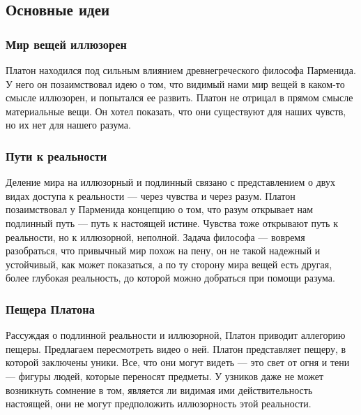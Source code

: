 \documentclass[
]{article}
\begin{document}
\hypertarget{ux43eux441ux43dux43eux432ux43dux44bux435-ux438ux434ux435ux438}{%
\subsection{Основные
идеи}\label{ux43eux441ux43dux43eux432ux43dux44bux435-ux438ux434ux435ux438}}

\hypertarget{ux43cux438ux440-ux432ux435ux449ux435ux439-ux438ux43bux43bux44eux437ux43eux440ux435ux43d}{%
\subsubsection{Мир вещей
иллюзорен}\label{ux43cux438ux440-ux432ux435ux449ux435ux439-ux438ux43bux43bux44eux437ux43eux440ux435ux43d}}

Платон находился под сильным влиянием древнегреческого философа
Парменида. У него он позаимствовал идею о том, что видимый нами мир
вещей в каком-то смысле иллюзорен, и попытался ее развить. Платон не
отрицал в прямом смысле материальные вещи. Он хотел показать, что они
существуют для наших чувств, но их нет для нашего разума.

\hypertarget{ux43fux443ux442ux438-ux43a-ux440ux435ux430ux43bux44cux43dux43eux441ux442ux438}{%
\subsubsection{Пути к
реальности}\label{ux43fux443ux442ux438-ux43a-ux440ux435ux430ux43bux44cux43dux43eux441ux442ux438}}

Деление мира на иллюзорный и подлинный связано с представлением о двух
видах доступа к реальности --- через чувства и через разум. Платон
позаимствовал у Парменида концепцию о том, что разум открывает нам
подлинный путь --- путь к настоящей истине. Чувства тоже открывают путь
к реальности, но к иллюзорной, неполной. Задача философа --- вовремя
разобраться, что привычный мир похож на пену, он не такой надежный и
устойчивый, как может показаться, а по ту сторону мира вещей есть
другая, более глубокая реальность, до которой можно добраться при помощи
разума.

\hypertarget{ux43fux435ux449ux435ux440ux430-ux43fux43bux430ux442ux43eux43dux430}{%
\subsubsection{Пещера
Платона}\label{ux43fux435ux449ux435ux440ux430-ux43fux43bux430ux442ux43eux43dux430}}

Рассуждая о подлинной реальности и иллюзорной, Платон приводит аллегорию
пещеры. Предлагаем пересмотреть видео о ней. Платон представляет пещеру,
в которой заключены уники. Все, что они могут видеть --- это свет от
огня и тени --- фигуры людей, которые переносят предметы. У узников даже
не может возникнуть сомнение в том, является ли видимая ими
действительность настоящей, они не могут предположить иллюзорность этой
реальности.
\end{document}
